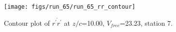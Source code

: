 \begin{figure}[H]
\centering
\texttt{[image: figs/run\_65/run\_65\_rr\_contour]}
\caption{Contour plot of $\overline{r^\prime r^\prime}$ at $z/c$=10.00, $V_{free}$=23.23, station 7.}
\label{fig:run_65_rr_contour}
\end{figure}


